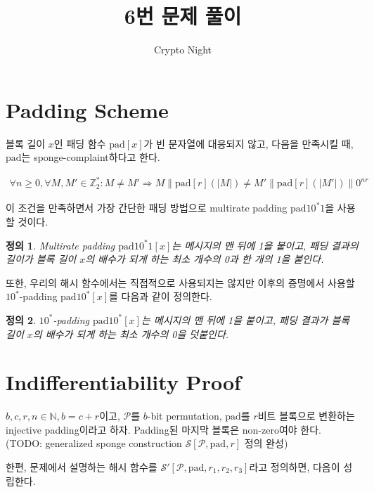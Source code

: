 \documentclass{article}
\title{6번 문제 풀이}
\author{Crypto Night}
\newtheorem{definition}{정의}
\begin{document}
  \maketitle

  \section{Padding Scheme}
  블록 길이 \(x\)인 패딩 함수 \(\mathrm{pad}[x]\)가 빈 문자열에 대응되지 않고, 다음을 만족시킬 때, \(\mathrm{pad}\)는 sponge-complaint하다고 한다.\cite{guido_cryptographic_2011}

  \begin{align*}
    \forall n \geq 0, \forall M, M' \in \mathbb{Z}^*_2 : M \not=M' \Rightarrow M \| \mathrm{pad}[r](|M|) \not= M' \| \mathrm{pad}[r](|M'|) \| 0^{nr}
  \end{align*}

  이 조건을 만족하면서 가장 간단한 패딩 방법으로 multirate padding \(\mathrm{pad10^*1}\)을 사용할 것이다.

  \begin{definition}
    Multirate padding \(\mathrm{pad10^*1}[x]\)는 메시지의 맨 뒤에 1을 붙이고, 패딩 결과의 길이가 블록 길이 \(x\)의 배수가 되게 하는 최소 개수의 0과 한 개의 1을 붙인다.
  \end{definition}

  또한, 우리의 해시 함수에서는 직접적으로 사용되지는 않지만 이후의 증명에서 사용할 \(10^*\)-padding \(\mathrm{pad10^*}[x]\)를 다음과 같이 정의한다.

  \begin{definition}
    \(10^*\)-padding \(\mathrm{pad10^*}[x]\)는 메시지의 맨 뒤에 1을 붙이고, 패딩 결과가 블록 길이 \(x\)의 배수가 되게 하는 최소 개수의 0을 덧붙인다.
  \end{definition}

  \section{Indifferentiability Proof}
  \(b, c, r, n \in \mathbb{N}, b = c + r\)이고, \(\mathcal{P}\)를 \(b\)-bit permutation, \(\mathrm{pad}\)를 \(r\)비트 블록으로 변환하는 injective padding이라고 하자. Padding된 마지막 블록은 non-zero여야 한다.
  (TODO: generalized sponge construction \(\mathcal{S}[\mathcal{P}, \mathrm{pad}, r]\)  정의 완성)

  한편, 문제에서 설명하는 해시 함수를 \(\mathcal{S}'[\mathcal{P}, \mathrm{pad}, r_1, r_2, r_3]\)라고 정의하면, 다음이 성립한다.
\end{document}
